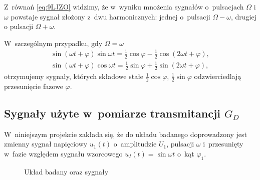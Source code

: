 \documentclass[paper=a4,DIV=12]{tfa}
\begin{document}
Z~równań \eqref{eq:9LJZO} widzimy, że w~wyniku mnożenia sygnałów
o~pulsacjach $\Omega$ i $\omega$ powstaje sygnał złożony z~dwu harmonicznych:
jednej o~pulsacji $\Omega - \omega$, drugiej o pulsacji $\Omega + \omega$.

W~szczególnym przypadku, gdy $\Omega = \omega$
\begin{subequations}
  \label{eq:EE55O}
  \begin{align}
    &
    \sin \left(\omega t + \varphi\right) \sin\omega t
    =
    \frac{1}{2} \cos{\varphi} - \frac{1}{2} \cos{(2 \omega t + \varphi)},
    &
    \label{eq:U3M0L}
    \\
    &
    \sin \left(\omega t + \varphi\right) \cos \omega t
    =
    \frac{1}{2} \sin{\varphi} + \frac{1}{2} \sin{(2 \omega t + \varphi)},
    &
    \label{eq:2ENFD}
  \end{align}
\end{subequations}
otrzymujemy sygnały, których składowe stałe $\frac{1}{2}\cos\varphi$,
$\frac{1}{2}\sin\varphi$ odzwierciedlają przesunięcie fazowe $\varphi$.

\subsection{Sygnały użyte w~pomiarze transmitancji $G_D$}
\label{sec:I1HGZ}

W~niniejszym projekcie zakłada się, że do układu badanego doprowadzony jest
zmienny sygnał napięciowy $u_1(t)$ o~amplitudzie $U_1$, pulsacji $\omega$
i~przesunięty w~fazie względem sygnału wzorcowego $u_I(t) = \sin{\omega t}$
o~kąt $\varphi_1$.
\begin{figure}[htbp]
  \centering
  \caption{Układ badany oraz sygnały}
  \label{fig:6DR1S}
\end{figure}
\end{document}
